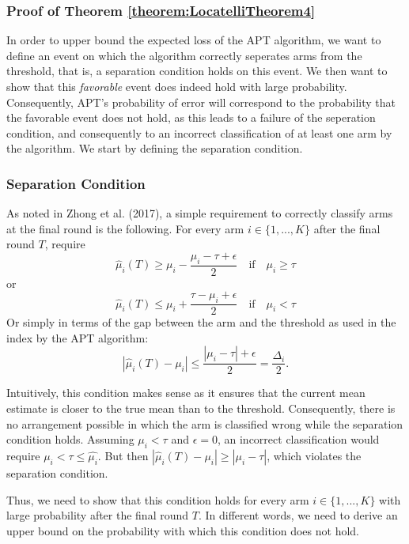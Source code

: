 \documentclass[11pt,]{article}
\begin{document}
\subsubsection{\texorpdfstring{Proof of Theorem
\ref{theorem:LocatelliTheorem4}}{Proof of Theorem }}\label{proof-of-theorem}

In order to upper bound the expected loss of the APT algorithm, we want
to define an event on which the algorithm correctly seperates arms from
the threshold, that is, a separation condition holds on this event. We
then want to show that this \emph{favorable} event does indeed hold with
large probability. Consequently, APT's probability of error will
correspond to the probability that the favorable event does not hold, as
this leads to a failure of the seperation condition, and consequently to
an incorrect classification of at least one arm by the algorithm. We
start by defining the separation condition.

\subsubsection{Separation Condition}\label{separation-condition}

As noted in Zhong et al. (2017), a simple requirement to correctly
classify arms at the final round is the following. For every arm
\(i \in \{1, ..., K\}\) after the final round \(T\), require \[
\hat{\mu}_{i}(T) \geq \mu_i - \frac{\mu_i - \tau + \epsilon}{2} \quad \text{if} \quad \mu_i \geq \tau
\] or \[
\hat{\mu}_{i}(T) \leq \mu_i + \frac{\tau - \mu_i + \epsilon}{2} \quad \text{if} \quad \mu_i < \tau
\] Or simply in terms of the gap between the arm and the threshold as
used in the index by the APT algorithm: \[
| \hat{\mu}_{i}(T) - \mu_i | \leq \frac{|\mu_i - \tau| + \epsilon}{2} = \frac{\Delta_i}{2}.
\]

Intuitively, this condition makes sense as it ensures that the current
mean estimate is closer to the true mean than to the threshold.
Consequently, there is no arrangement possible in which the arm is
classified wrong while the separation condition holds. Assuming
\(\mu_i < \tau\) and \(\epsilon = 0\), an incorrect classification would
require \(\mu_i < \tau \leq \hat{\mu_i}\). But then
\(| \hat{\mu}_{i}(T) - \mu_i | \geq |\mu_i - \tau|\), which violates the
separation condition.

Thus, we need to show that this condition holds for every arm
\(i \in \{1,...,K\}\) with large probability after the final round
\(T\). In different words, we need to derive an upper bound on the
probability with which this condition does not hold.
\end{document}
